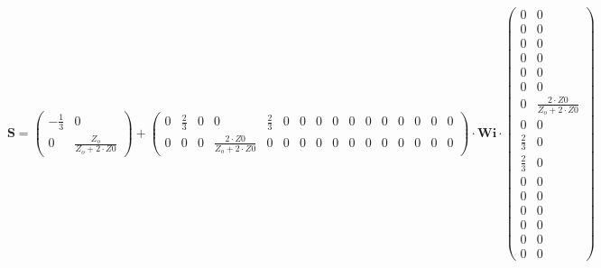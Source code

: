 \[ \mathbf{S} = \left(\begin{smallmatrix} -\frac{1}{3} & 0 \\ 0 &
\frac{Z_o}{Z_o+2\cdot Z0} \end{smallmatrix}\right) +
\left(\begin{smallmatrix} 0 & \frac{2}{3} & 0 & 0 & \frac{2}{3} & 0 &
0 & 0 & 0 & 0 & 0 & 0 & 0 & 0 & 0 & 0 \\ 0 & 0 & 0 & \frac{2\cdot
Z0}{Z_o+2\cdot Z0} & 0 & 0 & 0 & 0 & 0 & 0 & 0 & 0 & 0 & 0 & 0 & 0
\end{smallmatrix}\right) \cdot \mathbf{Wi}
\cdot\left(\begin{smallmatrix} 0 & 0 \\ 0 & 0 \\ 0 & 0 \\ 0 & 0 \\ 0 &
0 \\ 0 & 0 \\ 0 & \frac{2\cdot Z0}{Z_o+2\cdot Z0} \\ 0 & 0 \\
\frac{2}{3} & 0 \\ \frac{2}{3} & 0 \\ 0 & 0 \\ 0 & 0 \\ 0 & 0 \\ 0 & 0
\\ 0 & 0 \\ 0 & 0 \end{smallmatrix}\right) \]
